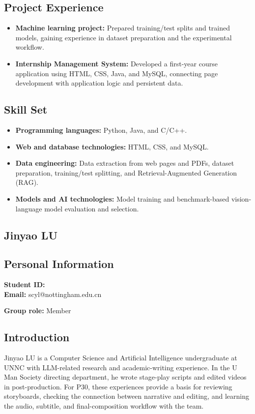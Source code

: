 \documentclass[a4paper,12pt]{article}
\newcommand{\PersonalInformation}[2]{%
  \subsection*{Personal Information}
  \if\relax\detokenize{#1}\relax\else
  \noindent\textbf{Student ID:} #1\\
  \fi
  \textbf{Email:} #2\par
}
\begin{document}
\subsection*{Project Experience}
\begin{itemize}
  \item \textbf{Machine learning project:} Prepared training/test splits and trained models, gaining experience in dataset preparation and the experimental workflow.
  \item \textbf{Internship Management System:} Developed a first-year course application using HTML, CSS, Java, and MySQL, connecting page development with application logic and persistent data.
\end{itemize}

\subsection*{Skill Set}
\begin{itemize}
  \item \textbf{Programming languages:} Python, Java, and C/C++.
  \item \textbf{Web and database technologies:} HTML, CSS, and MySQL.
  \item \textbf{Data engineering:} Data extraction from web pages and PDFs, dataset preparation, training/test splitting, and Retrieval-Augmented Generation (RAG).
  \item \textbf{Models and AI technologies:} Model training and benchmark-based vision-language model evaluation and selection.
\end{itemize}

\subsection{Jinyao LU}
\PersonalInformation{}{scyl@nottingham.edu.cn}
\noindent\textbf{Group role:} Member\par

\subsection*{Introduction}
Jinyao LU is a Computer Science and Artificial Intelligence undergraduate at UNNC with LLM-related research and academic-writing experience. In the U Man Society directing department, he wrote stage-play scripts and edited videos in post-production. For P30, these experiences provide a basis for reviewing storyboards, checking the connection between narrative and editing, and learning the audio, subtitle, and final-composition workflow with the team.
\end{document}
